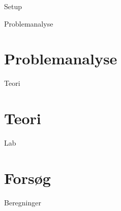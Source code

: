 

\raggedbottom



\frontmatter %


	\begin{folderinput}{Setup}

\cleardoublepage

\cleardoublepage

\tableofcontents*												%

	\end{folderinput}

\mainmatter %

	\begin{folderinput}{Problemanalyse}
\chapter{Problemanalyse}








	\end{folderinput}
	
\begin{folderinput} {Teori}
\chapter{Teori}



\end{folderinput}

	\begin{folderinput}{Lab}
\chapter{Forsøg}



	\end{folderinput}

	\begin{folderinput}{Beregninger}

	\end{folderinput}

%
	
	


\appendix
\clearforchapter
{}
{}



%
